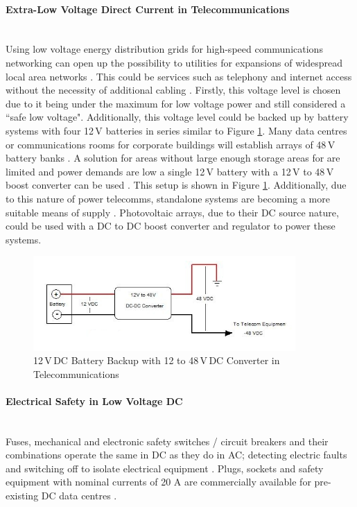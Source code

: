 \paragraph{Extra-Low Voltage Direct Current in Telecommunications}
~\\
Using low voltage energy distribution grids for high-speed communications networking can open up the possibility to utilities for expansions of widespread local area networks \cite{Waldeck1998}. This could be services such as telephony and internet access without the necessity of additional cabling \cite{Waldeck1998}. Firstly, this voltage level is chosen due to it being under the maximum for low voltage power and still considered a ``safe low voltage". Additionally, this voltage level could be backed up by battery systems with four 12\,V batteries in series similar to Figure \ref{fig:48VTelecomms}. Many data centres or communications rooms for corporate buildings will establish arrays of 48\,V battery banks \cite{website:48VTelecomms}. A solution for areas without large enough storage areas for are limited and power demands are low a single 12\,V battery with a 12\,V to 48\,V boost converter can be used \cite{website:48VTelecomms}. This setup is shown in Figure \ref{fig:48VTelecomms}. Additionally, due to this nature of power telecomms, standalone systems are becoming a more suitable means of supply \cite{Ribeiro2009}. Photovoltaic arrays, due to their DC source nature, could be used with a DC to DC boost converter and regulator to power these systems.   

\begin{figure}[H]
	\hfill\includegraphics[width = 100mm]{images/12V_Telecomms.png}\hspace*{\fill}
	\caption{12\,V\,DC Battery Backup with 12 to 48\,V\,DC Converter in Telecommunications \cite{website:48VTelecomms}}
	\label{fig:48VTelecomms}
\end{figure}  

\paragraph{Electrical Safety in Low Voltage DC}
~\\
Fuses, mechanical and electronic safety switches / circuit breakers and their combinations operate the same in DC as they do in AC; detecting electric faults and switching off to isolate electrical equipment \cite{Meckler2014}. Plugs, sockets and safety equipment with nominal currents of 20 \si{A} are commercially available for pre-existing DC data centres \cite{Meckler2014}. 

